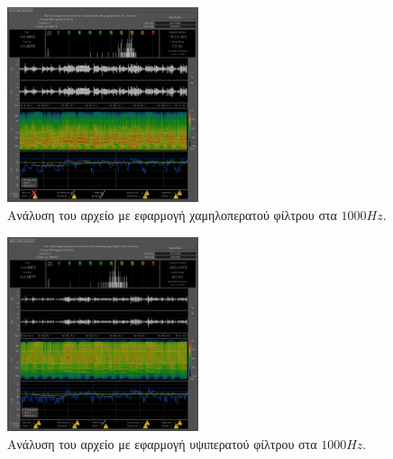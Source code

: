 \documentclass{article}
\begin{document}
\begin{figure}[htpb]
    \centering
    \includegraphics[width=0.5\textwidth]{./assets/session_1000_lp.png}
    \caption{Ανάλυση του αρχείο  με εφαρμογή χαμηλοπερατού φίλτρου στα $1000Hz$.}
    \label{fig:sessionanalysislp1000}
\end{figure}

\begin{figure}[htpb]
    \centering
    \includegraphics[width=0.5\textwidth]{./assets/session_1000_hp.png}
    \caption{Ανάλυση του αρχείο  με εφαρμογή υψιπερατού φίλτρου στα $1000Hz$.}
    \label{fig:sessionanalysishp1000}
\end{figure}


\newpage


\end{document}
